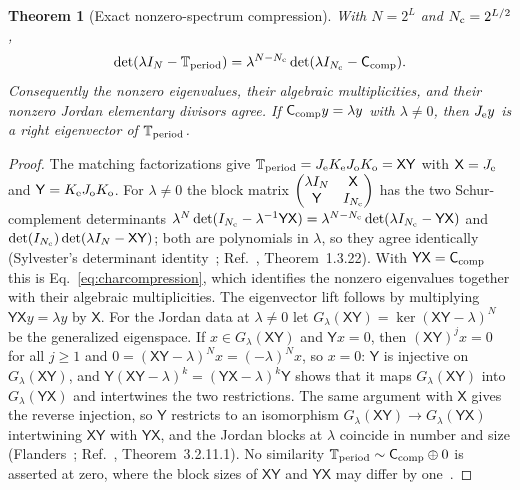 \documentclass[aps,prx,reprint,superscriptaddress,nobibnotes,longbibliography]{revtex4-2}
\newtheorem{theorem}{Theorem}
\theoremstyle{remark}
\newcommand{\Ccomp}{\mathsf C_{\rm comp}}
\newcommand{\Tper}{\mathbb T_{\rm period}}
\begin{document}
\begin{theorem}[Exact nonzero-spectrum compression]
\label{thm:compression}
With $N=2^L$ and $N_{\rm c}=2^{L/2}$,
\begin{equation}
 \det(\lambda I_N-\Tper)
 =\lambda^{N-N_{\rm c}}\det(\lambda I_{N_{\rm c}}-\Ccomp).
 \label{eq:charcompression}
\end{equation}
Consequently the nonzero eigenvalues, their algebraic multiplicities, and their nonzero Jordan elementary divisors agree.  If
$\Ccomp y=\lambda y$ with $\lambda\ne0$, then $J_{\rm e}y$ is a right eigenvector of $\Tper$.
\end{theorem}

\begin{proof}
The matching factorizations give
$\Tper=J_{\rm e}K_{\rm e}J_{\rm o}K_{\rm o}=\mathsf X\mathsf Y$
with $\mathsf X=J_{\rm e}$ and $\mathsf Y=K_{\rm e}J_{\rm o}K_{\rm o}$.  For $\lambda\ne0$ the block matrix $\begin{pmatrix}\lambda I_N&\mathsf X\\ \mathsf Y&I_{N_{\rm c}}\end{pmatrix}$ has the two Schur-complement determinants $\lambda^{N}\det(I_{N_{\rm c}}-\lambda^{-1}\mathsf Y\mathsf X)=\lambda^{N-N_{\rm c}}\det(\lambda I_{N_{\rm c}}-\mathsf Y\mathsf X)$ and $\det(I_{N_{\rm c}})\det(\lambda I_N-\mathsf X\mathsf Y)$; both are polynomials in $\lambda$, so they agree identically (Sylvester's determinant identity~\cite{Sylvester1851}; Ref.~\cite{HornJohnson2013}, Theorem~1.3.22).  With $\mathsf Y\mathsf X=\Ccomp$ this is Eq.~\eqref{eq:charcompression}, which identifies the nonzero eigenvalues together with their algebraic multiplicities.  The eigenvector lift follows by multiplying $\mathsf Y\mathsf Xy=\lambda y$ by $\mathsf X$.  For the Jordan data at $\lambda\ne0$ let $G_\lambda(\mathsf X\mathsf Y)=\ker(\mathsf X\mathsf Y-\lambda)^N$ be the generalized eigenspace.  If $x\in G_\lambda(\mathsf X\mathsf Y)$ and $\mathsf Yx=0$, then $(\mathsf X\mathsf Y)^jx=0$ for all $j\ge1$ and $0=(\mathsf X\mathsf Y-\lambda)^Nx=(-\lambda)^Nx$, so $x=0$: $\mathsf Y$ is injective on $G_\lambda(\mathsf X\mathsf Y)$, and $\mathsf Y(\mathsf X\mathsf Y-\lambda)^k=(\mathsf Y\mathsf X-\lambda)^k\mathsf Y$ shows that it maps $G_\lambda(\mathsf X\mathsf Y)$ into $G_\lambda(\mathsf Y\mathsf X)$ and intertwines the two restrictions.  The same argument with $\mathsf X$ gives the reverse injection, so $\mathsf Y$ restricts to an isomorphism $G_\lambda(\mathsf X\mathsf Y)\to G_\lambda(\mathsf Y\mathsf X)$ intertwining $\mathsf X\mathsf Y$ with $\mathsf Y\mathsf X$, and the Jordan blocks at $\lambda$ coincide in number and size (Flanders~\cite{Flanders1951}; Ref.~\cite{HornJohnson2013}, Theorem~3.2.11.1).  No similarity $\Tper\sim\Ccomp\oplus0$ is asserted at zero, where the block sizes of $\mathsf X\mathsf Y$ and $\mathsf Y\mathsf X$ may differ by one~\cite{Flanders1951}.
\end{proof}
\end{document}
